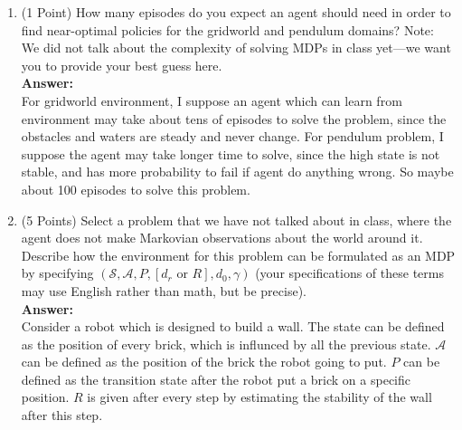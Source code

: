 \documentclass[]{article}
\begin{document}
\begin{enumerate}
    \item (1 Point)  How many episodes do you expect an agent should need in order to find near-optimal policies for the gridworld and pendulum domains? 
    Note: We did not talk about the complexity of solving MDPs in class yet---we want you to provide your best guess here. 
    \\
    \textbf{Answer:}\\
    For gridworld environment, I suppose an agent which can learn from environment may take about tens of episodes to solve the problem, since the obstacles and waters are steady and never change. For pendulum problem, I suppose the agent may take longer time to solve, since the high state is not stable, and has more probability to fail if agent do anything wrong. So maybe about 100 episodes to solve this problem.

    \item (5 Points) Select a problem that we have not talked about in class, where the agent does not make Markovian observations about the world around it. Describe how the environment for this problem can be formulated as an MDP by specifying $(\mathcal S, \mathcal A, P, [d_r\text{ or } R], d_0, \gamma)$ (your specifications of these terms may use English rather than math, but be precise). 
    \\
    \textbf{Answer:}\\
    Consider a robot which is designed to build a wall. The state can be defined as the position of every brick, which is influnced by all the previous state. $\mathcal A$ can be defined as the position of the brick the robot going to put. $P$ can be defined as the transition state after the robot put a brick on a specific position. $R$ is given after every step by estimating the stability of the wall after this step. 
    

\end{enumerate}
\end{document}
